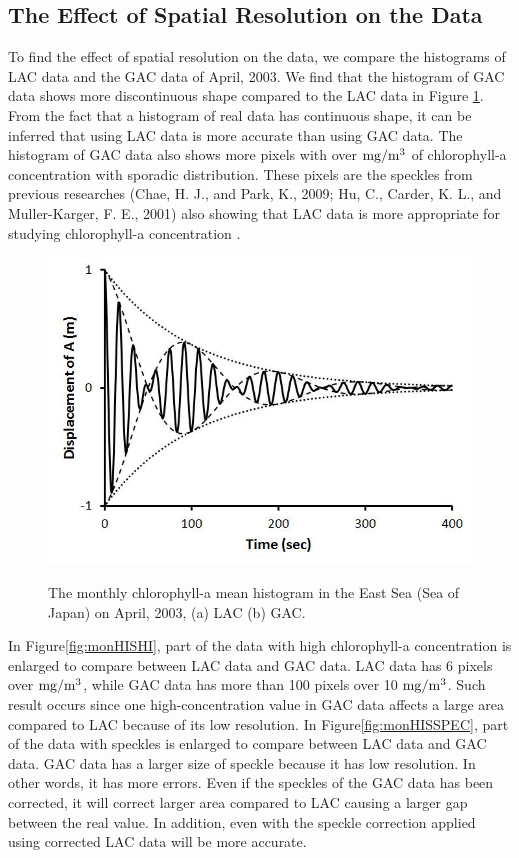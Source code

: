 \subsection{The Effect of Spatial Resolution on the Data}
 
To find the effect of spatial resolution on the data, we compare the histograms of LAC data and the GAC data of April, 2003. We find that the histogram of GAC data shows more discontinuous shape compared to the LAC data in Figure \ref{fig:monHIS}. From the fact that a histogram of real data has continuous shape, it can be inferred that using LAC data is more accurate than using GAC data. The histogram of GAC data also shows more pixels with over $\rm mg/m^3$ of chlorophyll-a concentration with sporadic distribution. These pixels are the speckles from previous researches (Chae, H. J., and Park, K., 2009; Hu, C., Carder, K. L., and Muller-Karger, F. E., 2001) also showing that LAC data is more appropriate for studying chlorophyll-a concentration \cite{chae2009characteristics,hu2001precise}.
  
\begin{figure}[h]
	\centering
	\includegraphics[width=0.8\linewidth]{../images/monHIS}\\
	\caption{The monthly chlorophyll-a mean histogram in the East Sea (Sea of Japan) on April, 2003, (a) LAC (b) GAC.}
	\label{fig:monHIS}
\end{figure}
 
In Figure\ref{fig:monHISHI}, part of the data with high chlorophyll-a concentration is enlarged to compare between LAC data and GAC data. LAC data has 6 pixels over $\rm mg/m^3$, while GAC data has more than 100 pixels over 10 $\rm mg/m^3$. Such result occurs since one high-concentration value in GAC data affects a large area compared to LAC because of its low resolution.
In Figure\ref{fig:monHISSPEC}, part of the data with speckles is enlarged to compare between LAC data and GAC data. GAC data has a larger size of speckle because it has low resolution. In other words, it has more errors. Even if the speckles of the GAC data has been corrected, it will correct larger area compared to LAC causing a larger gap between the real value. In addition, even with the speckle correction applied using corrected LAC data will be more accurate.
    
